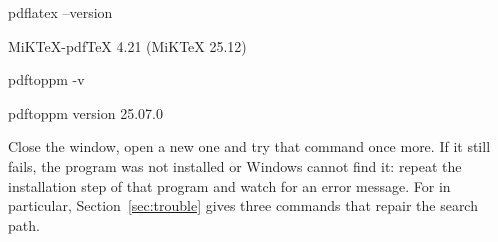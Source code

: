 \begin{ps}
pdflatex --version
\end{ps}
\begin{out}
MiKTeX-pdfTeX 4.21 (MiKTeX 25.12)
\end{out}

\begin{ps}
pdftoppm -v
\end{ps}
\begin{out}
pdftoppm version 25.07.0
\end{out}


\begin{iffail}
Close the window, open a new one and try that command once more. If it still fails, the program
was not installed or Windows cannot find it: repeat the installation step of that program and
watch for an error message. For  in particular, Section~\ref{sec:trouble} gives
three commands that repair the search path.
\end{iffail}
